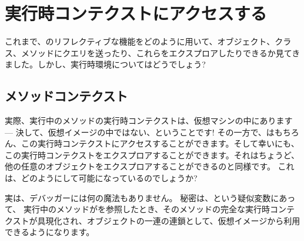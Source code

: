 \documentclass[a4paper,10pt,twoside]{book}
\begin{document}
\section{実行時コンテクストにアクセスする}

これまで、\st{}のリフレクティブな機能をどのように用いて、オブジェクト、クラス、メソッドにクエリを送ったり、これらをエクスプロアしたりできるか見てきました。しかし、実行時環境についてはどうでしょう?

\subsection{メソッドコンテクスト}

実際、実行中のメソッドの実行時コンテクストは、仮想マシンの中にあります --- 決して、仮想イメージの中ではない、ということです!
その一方で、はもちろん、この実行時コンテクストにアクセスすることができます。そして幸いにも、この実行時コンテクストをエクスプロアすることができます。それはちょうど、他の任意のオブジェクトをエクスプロアすることができるのと同様です。
これは、どのようにして可能になっているのでしょうか?

実は、デバッガーには何の魔法もありません。
秘密は、という疑似変数にあって、%
実行中のメソッドがを参照したとき、そのメソッドの完全な実行時コンテクストが具現化され、オブジェクトの一連の連鎖として、仮想イメージから利用できるようになります。
\end{document}
